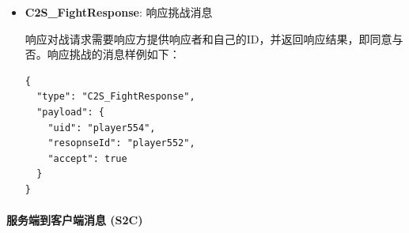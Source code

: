 \begin{itemize}
    \item \textbf{C2S\_FightResponse}: 响应挑战消息  

        响应对战请求需要响应方提供响应者和自己的ID，并返回响应结果，即同意与否。响应挑战的消息样例如下：
\begin{tcolorbox}[title=C2S\_FightResponse]
\begin{verbatim}
{
  "type": "C2S_FightResponse",
  "payload": {
    "uid": "player554",
    "resopnseId": "player552",
    "accept": true
  }
}
\end{verbatim}
\end{tcolorbox}

    
\end{itemize}

\paragraph{服务端到客户端消息 (S2C)}
